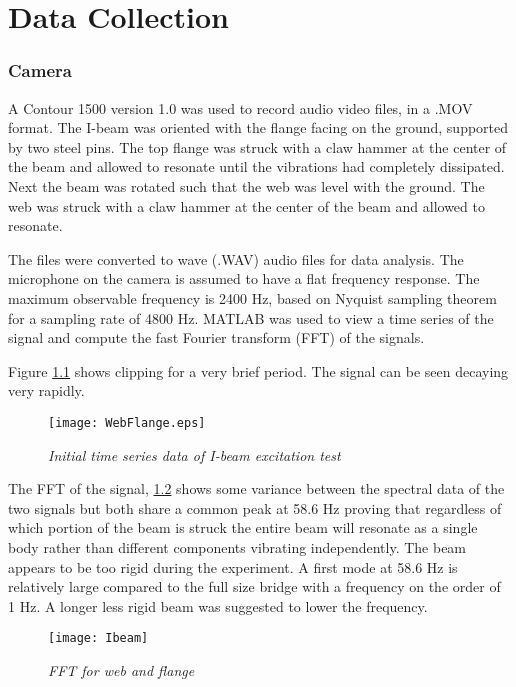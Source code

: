 

\chapter{Data Collection}
\subsection{Camera}
\indent A Contour 1500 version 1.0 was used to record audio video files, in a .MOV format. The I-beam was oriented with the flange facing on the ground, supported by two steel pins. The top flange was struck with a claw hammer at the center of the beam and allowed to resonate until the vibrations had completely dissipated. Next the beam was rotated such that the web was level with the ground. The web was struck with a claw hammer at the center of the beam and allowed to resonate. 

\indent The files were converted to wave (.WAV) audio files for data analysis. The microphone on the camera is assumed to have a flat frequency response. The maximum observable frequency is 2400 Hz, based on Nyquist sampling theorem for a sampling rate of 4800 Hz. MATLAB was used to view a time series of the signal and compute the fast Fourier transform (FFT) of the signals.

Figure \ref{fig:RES_Cam_WebFlange} shows clipping for a very brief period. The signal can be seen decaying very rapidly.

\begin{figure}
\centering
\texttt{[image: WebFlange.eps]}
\caption{\textit{Initial time series data of I-beam excitation test}}
\label{fig:RES_Cam_WebFlange}
\end{figure}

\indent The FFT of the signal, \ref{fig:IbeamFFT} shows some variance between the spectral data of the two signals but both share a common peak at 58.6 Hz proving that regardless of which portion of the beam is struck the entire beam will resonate as a single body rather than different components vibrating independently.  The beam appears to be too rigid during the experiment. A first mode at 58.6 Hz is relatively large compared to the full size bridge with a frequency on the order of 1 Hz. A longer less rigid beam was suggested to lower the frequency. 

\begin{figure}
\centering
\texttt{[image: Ibeam]}
\caption{\textit{FFT for web and flange}}
\label{fig:IbeamFFT}
\end{figure}

